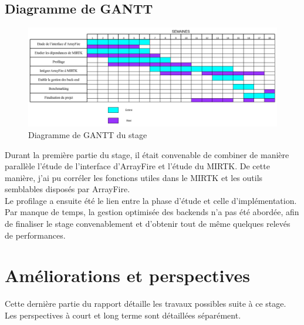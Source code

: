 \documentclass[10pt]{report}
\begin{document}
\section{Diagramme de GANTT}
	\begin{figure}[h!]
		\begin{center}
			\includegraphics[width=18cm]{ganttchart.png}
		\end{center}	
		\caption{Diagramme de GANTT du stage}
		\label{Diagramme de GANTT du stage}
	\end{figure}
	Durant la première partie du stage, il était convenable de combiner de manière parallèle l'étude de l'interface d'ArrayFire et l'étude du MIRTK. De cette manière, j'ai pu corréler les fonctions utiles dans le MIRTK et les outils semblables disposés par ArrayFire.\\
	Le profilage a ensuite été le lien entre la phase d'étude et celle d'implémentation. \\
	Par manque de temps, la gestion optimisée des backends n'a pas été abordée, afin de finaliser le stage convenablement et d'obtenir tout de même quelques relevés de performances.
	
\chapter{Améliorations et perspectives} \vspace{-1cm}
Cette dernière partie du rapport détaille les travaux possibles suite à ce stage. Les perspectives à court et long terme sont détaillées séparément.
\end{document}
